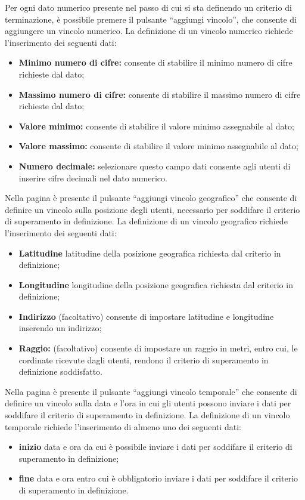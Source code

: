 Per ogni dato numerico presente nel passo di cui si sta definendo un criterio di terminazione, è possibile premere il pulsante ``aggiungi vincolo'', che consente di aggiungere un vincolo numerico.
La definizione di un vincolo numerico richiede l'inserimento dei seguenti dati:
\begin{itemize}
\item \textbf{Minimo numero di cifre:} consente di stabilire il minimo numero di cifre richieste dal dato;
\item \textbf{Massimo numero di cifre:} consente di stabilire il massimo numero di cifre richieste dal dato;
\item \textbf{Valore minimo:} consente di stabilire il valore minimo assegnabile al dato;
\item \textbf{Valore massimo:} consente di stabilire il valore minimo assegnabile al dato;
\item \textbf{Numero decimale:} selezionare questo campo dati consente agli utenti di inserire cifre decimali nel dato numerico.
\end{itemize}

Nella pagina è presente il pulsante ``aggiungi vincolo geografico'' che consente di definire un vincolo sulla posizione degli utenti, necessario per soddifare il criterio di superamento in definizione.
La definizione di un vincolo geografico richiede l'inserimento dei seguenti dati:
\begin{itemize}
\item \textbf{Latitudine} latitudine della posizione geografica richiesta dal criterio in definizione;
\item \textbf{Longitudine} longitudine della posizione geografica richiesta dal criterio in definizione;
\item \textbf{Indirizzo} (facoltativo) consente di impostare latitudine e longitudine inserendo un indirizzo;
\item \textbf{Raggio:} (facoltativo) consente di impostare un raggio in metri, entro cui, le cordinate ricevute dagli utenti, rendono il criterio di superamento in definizione soddisfatto.
\end{itemize}

Nella pagina è presente il pulsante ``aggiungi vincolo temporale'' che consente di definire un vincolo sulla data e l'ora in cui gli utenti possono inviare i dati per soddifare il criterio di superamento in definizione.
La definizione di un vincolo temporale richiede l'inserimento di almeno uno dei seguenti dati:
\begin{itemize}
\item \textbf{inizio} data e ora da cui è possibile inviare i dati per soddifare il criterio di superamento in definizione;
\item \textbf{fine} data e ora entro cui è obbligatorio inviare i dati per soddifare il criterio di superamento in definizione.
\end{itemize}

